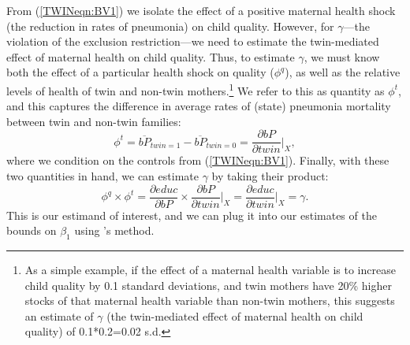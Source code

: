 From (\ref{TWINeqn:BV1}) we isolate the effect of a positive maternal health 
shock (the reduction in rates of pneumonia) on child quality.  However, for 
$\gamma$---the violation of the exclusion restriction---we need to estimate the 
twin-mediated effect of maternal health on child quality.  Thus, to estimate 
$\gamma$, we must know both the effect of a particular health shock on quality
($\phi^q$), as well as the relative levels of health of twin and non-twin 
mothers.\footnote{As a simple example, if the effect of a maternal health 
variable is to increase child quality by 0.1 standard deviations, and twin 
mothers have 20\% higher stocks of that maternal health variable than non-twin 
mothers, this suggests an estimate of $\gamma$ (the twin-mediated effect of
maternal health on child quality) of 0.1*0.2=0.02 s.d.}  We refer to this as
quantity as $\phi^t$, and this captures the difference in average rates of 
(state) pneumonia mortality between twin and non-twin families:
\begin{equation}
\label{TWINeqn:BV2}
\phi^t=\overline{bP}_{twin=1}-\overline{bP}_{twin=0}=
\frac{\partial bP}{\partial twin}\bigg|_{X},
\end{equation}
where we condition on the controls from (\ref{TWINeqn:BV1}).  Finally, with 
these two quantities in hand, we can estimate $\gamma$ by taking their product:
\begin{equation}
\label{TWINeqn:realgamma}
\phi^q\times\phi^t=\frac{\partial educ}{\partial bP}\times
\frac{\partial bP}{\partial twin}\bigg|_{X}=
\frac{\partial educ}{\partial twin}\bigg|_{X}=\gamma.
\end{equation}
This is our estimand of interest, and we can plug it into our estimates of
the bounds on $\beta_1$ using \citeauthor{Conleyetal2012}'s method.

